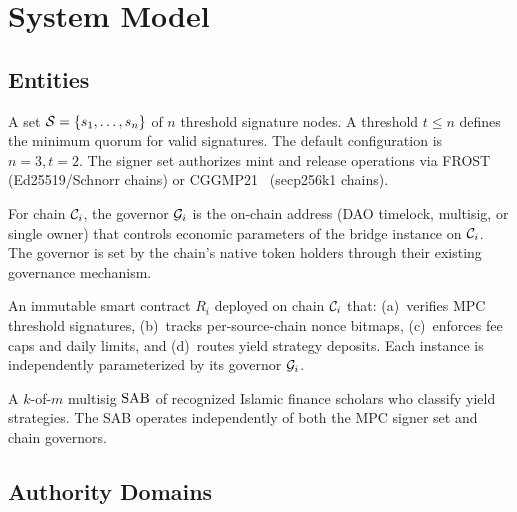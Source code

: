 \section{System Model}

\label{sec:system}

\subsection{Entities}

\begin{definition}
\label{def:signer}
A set $\mathcal{S} = \{s_1, \ldots, s_n\}$ of $n$ threshold signature nodes. A threshold $t \leq n$ defines the minimum quorum for valid signatures. The default configuration is $n = 3, t = 2$. The signer set authorizes mint and release operations via FROST~\cite{frost} (Ed25519/Schnorr chains) or CGGMP21~\cite{cggmp21} (secp256k1 chains).
\end{definition}

\begin{definition}
\label{def:governor}
For chain $\mathcal{C}_i$, the governor $\mathcal{G}_i$ is the on-chain address (DAO timelock, multisig, or single owner) that controls economic parameters of the bridge instance on $\mathcal{C}_i$. The governor is set by the chain's native token holders through their existing governance mechanism.
\end{definition}

\begin{definition}
\label{def:router}
An immutable smart contract $R_i$ deployed on chain $\mathcal{C}_i$ that: (a)~verifies MPC threshold signatures, (b)~tracks per-source-chain nonce bitmaps, (c)~enforces fee caps and daily limits, and (d)~routes yield strategy deposits. Each instance is independently parameterized by its governor $\mathcal{G}_i$.
\end{definition}

\begin{definition}
\label{def:sab}
A $k$-of-$m$ multisig $\text{SAB}$ of recognized Islamic finance scholars who classify yield strategies. The SAB operates independently of both the MPC signer set and chain governors.
\end{definition}

\subsection{Authority Domains}

